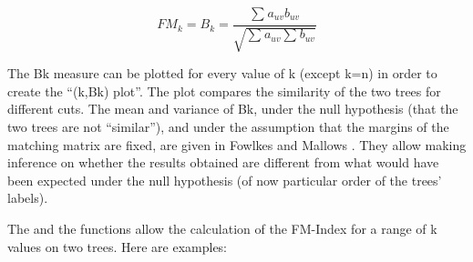 \documentclass[shortnames,nojss,article]{jss}\usepackage[]{graphicx}\usepackage[]{color}
\begin{document}
\[{FM_k} = {B_k} = \frac{{\sum\limits_{}^{} {{a_{uv}}{b_{uv}}} }}{{\sqrt {\sum\limits_{}^{} {{a_{uv}}} \sum\limits_{}^{} {{b_{uv}}} } }}\]

The Bk measure can be plotted for every value of k (except k=n) in order to create the “(k,Bk) plot”.  The plot compares the similarity of the two trees for different cuts. The mean and variance of Bk, under the null hypothesis (that the two trees are not “similar”), and under the assumption that the margins of the matching matrix are fixed, are given in Fowlkes and Mallows \citep{fowlkes1983method}. They allow making inference on whether the results obtained are different from what would have been expected under the null hypothesis (of now particular order of the trees' labels).

The  and the  functions allow the calculation of the FM-Index for a range of k values on two trees. Here are examples:
\end{document}
